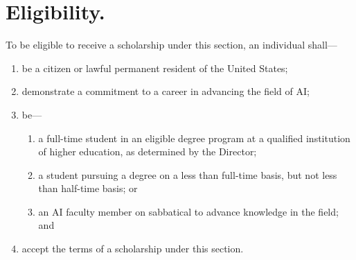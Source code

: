 \documentclass{article}
\begin{document}
    \section{Eligibility.}To be eligible to receive a scholarship under 
this section, an individual shall---
\begin{enumerate}
            \item be a citizen or lawful permanent resident of the United 
        States;
            \item demonstrate a commitment to a career in advancing the 
        field of AI;
            \item be---
\begin{enumerate}
                    \item a full-time student in an eligible degree 
                program at a qualified institution of higher education, 
                as determined by the Director;
                    \item a student pursuing a degree on a less than 
                full-time basis, but not less than half-time basis; or
                    \item an AI faculty member on sabbatical to advance 
                knowledge in the field; and
\end{enumerate}
            \item accept the terms of a scholarship under this section.
\end{enumerate}
\end{document}
